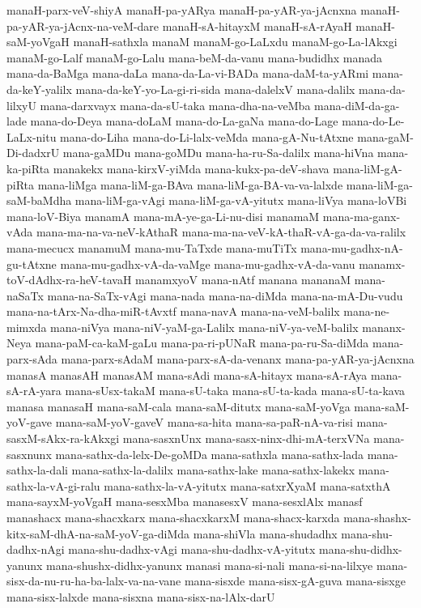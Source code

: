 {manaH-parx-veV-shiyA
manaH-pa-yARya
manaH-pa-yAR-ya-jAcnxna
manaH-pa-yAR-ya-jAcnx-na-veM-dare
manaH-sA-hitayxM
manaH-sA-rAyaH
manaH-saM-yoVgaH
manaH-sathxla
manaM
manaM-go-LaLxdu
manaM-go-La-lAkxgi
manaM-go-Lalf
manaM-go-Lalu
mana-beM-da-vanu
mana-budidhx
manada
mana-da-BaMga
mana-daLa
mana-da-La-vi-BADa
mana-daM-ta-yARmi
mana-da-keY-yalilx
mana-da-keY-yo-La-gi-ri-sida
mana-dalelxV
mana-dalilx
mana-da-lilxyU
mana-darxvayx
mana-da-sU-taka
mana-dha-na-veMba
mana-diM-da-ga-lade
mana-do-Deya
mana-doLaM
mana-do-La-gaNa
mana-do-Lage
mana-do-Le-LaLx-nitu
mana-do-Liha
mana-do-Li-lalx-veMda
mana-gA-Nu-tAtxne
mana-gaM-Di-dadxrU
mana-gaMDu
mana-goMDu
mana-ha-ru-Sa-dalilx
mana-hiVna
mana-ka-piRta
manakekx
mana-kirxV-yiMda
mana-kukx-pa-deV-shava
mana-liM-gA-piRta
mana-liMga
mana-liM-ga-BAva
mana-liM-ga-BA-va-va-lalxde
mana-liM-ga-saM-baMdha
mana-liM-ga-vAgi
mana-liM-ga-vA-yitutx
mana-liVya
mana-loVBi
mana-loV-Biya
manamA
mana-mA-ye-ga-Li-nu-disi
manamaM
mana-ma-ganx-vAda
mana-ma-na-va-neV-kAthaR
mana-ma-na-veV-kA-thaR-vA-ga-da-va-ralilx
mana-mecucx
manamuM
mana-mu-TaTxde
mana-muTiTx
mana-mu-gadhx-nA-gu-tAtxne
mana-mu-gadhx-vA-da-vaMge
mana-mu-gadhx-vA-da-vanu
manamx-toV-dAdhx-ra-heV-tavaH
manamxyoV
mana-nAtf
manana
mananaM
mana-naSaTx
mana-na-SaTx-vAgi
mana-nada
mana-na-diMda
mana-na-mA-Du-vudu
mana-na-tArx-Na-dha-miR-tAvxtf
mana-navA
mana-na-veM-balilx
mana-ne-mimxda
mana-niVya
mana-niV-yaM-ga-Lalilx
mana-niV-ya-veM-balilx
mananx-Neya
mana-paM-ca-kaM-gaLu
mana-pa-ri-pUNaR
mana-pa-ru-Sa-diMda
mana-parx-sAda
mana-parx-sAdaM
mana-parx-sA-da-venanx
mana-pa-yAR-ya-jAcnxna
manasA
manasAH
manasAM
mana-sAdi
mana-sA-hitayx
mana-sA-rAya
mana-sA-rA-yara
mana-sUsx-takaM
mana-sU-taka
mana-sU-ta-kada
mana-sU-ta-kava
manasa
manasaH
mana-saM-cala
mana-saM-ditutx
mana-saM-yoVga
mana-saM-yoV-gave
mana-saM-yoV-gaveV
mana-sa-hita
mana-sa-paR-nA-va-risi
mana-sasxM-sAkx-ra-kAkxgi
mana-sasxnUnx
mana-sasx-ninx-dhi-mA-terxVNa
mana-sasxnunx
mana-sathx-da-lelx-De-goMDa
mana-sathxla
mana-sathx-lada
mana-sathx-la-dali
mana-sathx-la-dalilx
mana-sathx-lake
mana-sathx-lakekx
mana-sathx-la-vA-gi-ralu
mana-sathx-la-vA-yitutx
mana-satxrXyaM
mana-satxthA
mana-sayxM-yoVgaH
mana-sesxMba
manasesxV
mana-sesxlAlx
manasf
manashacx
mana-shacxkarx
mana-shacxkarxM
mana-shacx-karxda
mana-shashx-kitx-saM-dhA-na-saM-yoV-ga-diMda
mana-shiVla
mana-shudadhx
mana-shu-dadhx-nAgi
mana-shu-dadhx-vAgi
mana-shu-dadhx-vA-yitutx
mana-shu-didhx-yanunx
mana-shushx-didhx-yanunx
manasi
mana-si-nali
mana-si-na-lilxye
mana-sisx-da-nu-ru-ha-ba-lalx-va-na-vane
mana-sisxde
mana-sisx-gA-guva
mana-sisxge
mana-sisx-lalxde
mana-sisxna
mana-sisx-na-lAlx-darU
}

